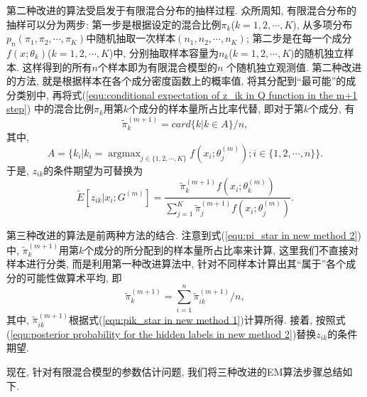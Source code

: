 \documentclass[a4paper,12pt,openany,oneside,utf-8]{ctexbook}
\begin{document}
第二种改进的算法受启发于有限混合分布的抽样过程. 众所周知, 有限混合分布的抽样可以分为两步: 第一步是根据设定的混合比例$\pi_{k}$($k=1, 2, \cdots, K$), 从多项分布$p_n(\pi_1, \pi_2, \cdots, \pi_K)$中随机抽取一次样本$(n_1, n_2, \cdots, n_K)$; 第二步是在每一个成分$f(x; \theta_{k})$($k=1, 2, \cdots, K$)中, 分别抽取样本容量为$n_k$($k=1, 2, \cdots, K$)的随机独立样本. 这样得到的所有$n$个样本即为有限混合模型的$n$ 个随机独立观测值. 第二种改进的方法, 就是根据样本在各个成分密度函数上的概率值, 将其分配到“最可能”的成分类别中, 再将式(\ref{equ:conditional expectation of z_ik in Q function in the m+1 step}) 中的混合比例$\pi_k$用第$k$个成分的样本量所占比率代替, 即对于第$k$个成分, 有
\begin{equation}
\label{equ:pi_star in new method 2}
  \tilde{\pi}_{k}^{(m+1)}=card\{k|k \in A\}/n,
\end{equation}
其中,
\begin{equation*}
\label{equ:set A in new method 2}
  A=\{k_i|k_i=\mathop{\arg\max}_{j\in\{1, 2, \cdots, K\}} f(x_{i}; \theta_{j}^{(m)}); i\in\{1, 2, \cdots, n\}\}.
\end{equation*}
于是, $z_{ik}$的条件期望为可替换为
\begin{equation}
\label{equ:posterior probability for the hidden labels in new method 2}
  \tilde{E}[z_{ik}|x_i;G^{(m)}]
  = \frac{\tilde{\pi}_{k}^{(m+1)}f(x_{i}; \theta_{k}^{(m)})}{\sum_{j=1}^{K}\tilde{\pi}_{j}^{(m+1)}f(x_{i}; \theta_{j}^{(m)})}.
\end{equation}

第三种改进的算法是前两种方法的结合. 注意到式(\ref{equ:pi_star in new method 2})中, $\tilde{\pi}_{k}^{(m+1)}$用第$k$个成分的所分配到的样本量所占比率来计算, 这里我们不直接对样本进行分类, 而是利用第一种改进算法中, 针对不同样本计算出其“属于”各个成分的可能性做算术平均, 即
\begin{equation}
\label{equ:pi_star in new method 3}
  \tilde{\pi}_{k}^{(m+1)}=\sum_{i=1}^{n}\tilde{\pi}_{ik}^{(m+1)}/n,
\end{equation}
其中, $\tilde{\pi}_{ik}^{(m+1)}$根据式(\ref{equ:pik_star in new method 1})计算所得. 接着, 按照式(\ref{equ:posterior probability for the hidden labels in new method 2})替换$z_{ik}$的条件期望.

现在, 针对有限混合模型的参数估计问题, 我们将三种改进的EM算法步骤总结如下.
\end{document}
